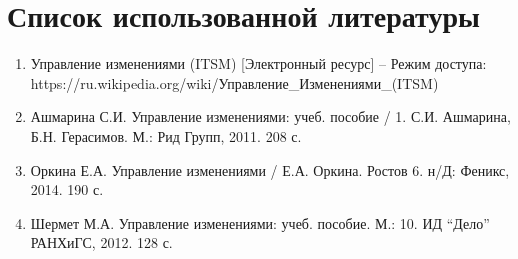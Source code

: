 \documentclass[a4paper,14pt]{extarticle}
\begin{document}
\section*{Список использованной литературы}
\begin{enumerate}
    \item Управление изменениями (ITSM) [Электронный ресурс] – Режим доступа:
          https://ru.wikipedia.org/wiki/Управление\_Изменениями\_(ITSM)
    \item Ашмарина С.И. Управление изменениями: учеб. пособие / 1. С.И.
          Ашмарина, Б.Н. Герасимов. М.: Рид Групп, 2011. 208 с.
    \item Оркина Е.А. Управление изменениями / Е.А. Оркина. Ростов 6. н/Д:
          Феникс, 2014. 190 с.
    \item Шермет М.А. Управление изменениями: учеб. пособие. М.: 10. ИД
          \enquote{Дело} РАНХиГС, 2012. 128 с.
\end{enumerate}
\end{document}

